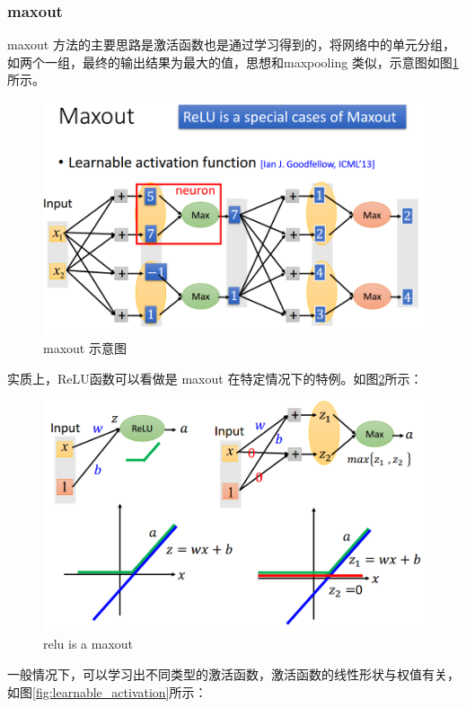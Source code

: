 \subsubsection{maxout}
maxout 方法的主要思路是激活函数也是通过学习得到的，将网络中的单元分组，如两个一组，最终的输出结果为最大的值，思想和maxpooling 类似，示意图如图\ref{fig:maxout}所示。
\begin{figure}[htb]
	\centering
	\includegraphics[scale=0.4]{pic/maxout}
	\caption{maxout 示意图}
	\label{fig:maxout}
\end{figure}

实质上，ReLU函数可以看做是 maxout 在特定情况下的特例。如图\ref{fig:relu_isa_maxout}所示：
\begin{figure}[htb]
	\centering
	\includegraphics[scale=0.4]{pic/relu_isa_maxout}
	\caption{relu is a maxout}
	\label{fig:relu_isa_maxout}
\end{figure}

一般情况下，可以学习出不同类型的激活函数，激活函数的线性形状与权值有关，如图\ref{fig:learnable_activation}所示：

